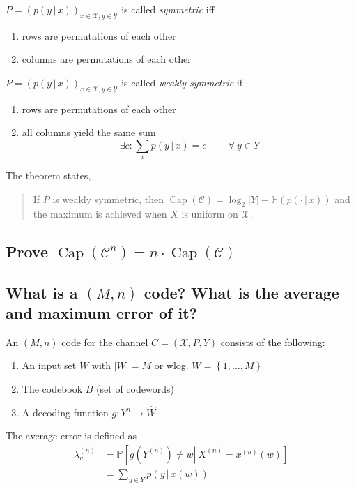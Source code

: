 \documentclass[a4paper]{article}
\newcommand\op[2][P]{\mathbb{#1}\left(#2\right)}
\newcommand\cons[3][P]{\mathbb{#1}\left[#2 \left|\:#3\right]\right.}
\newcommand\fall{\:\forall\:}
\newcommand\set[1]{\left\{#1\right\}}
\newcommand\key[1]{\textit{#1}}
\newcommand\card[1]{\left|#1\right|}
\DeclareMathOperator{\Capacity}{Cap}
\theoremstyle{definition}
\begin{document}
$P = (p(y\,|\,x))_{x \in \mathcal{X}, y \in \mathcal{Y}}$ is called \key{symmetric} iff
\begin{enumerate}
  \item rows are permutations of each other
  \item columns are permutations of each other
\end{enumerate}

$P = (p(y\,|\,x))_{x \in \mathcal{X}, y \in \mathcal{Y}}$ is called \key{weakly symmetric} if
\begin{enumerate}
  \item rows are permutations of each other
  \item all columns yield the same sum
    \[ \exists c: \sum_x p(y\,|\,x) = c \qquad \fall y \in Y \]
\end{enumerate}

The theorem states,
\begin{quote}
  If $P$ is weakly symmetric, then $\Capacity(\mathcal{C}) = \log_2\card{Y} - \op[H]{p(\cdot\,|\,x)}$ and the maximum is achieved when $X$ is uniform on $\mathcal{X}$.
\end{quote}

\subsection{Prove $\Capacity(\mathcal{C}^n) = n \cdot \Capacity(\mathcal{C})$}

\subsection{What is a $(M, n)$ code? What is the average and maximum error of it?}

An $(M, n)$ code for the channel $C = (\mathcal{X}, P, Y)$ consists of the following:
\begin{enumerate}
  \item An input set $W$ with $\card{W} = M$ or wlog. $W = \set{1,\dotsc,M}$
  \item The codebook $B$ (set of codewords)
  \item A decoding function $g: Y^n \rightarrow \hat W$
\end{enumerate}

The average error is defined as
\begin{align*}
  \lambda_w^{(n)} &= \cons{g(Y^{(n)}) \neq w}{X^{(n)} = x^{(n)}(w)} \\
                  &= \sum_{y \in Y} p(y \,|\, x(w))
\end{align*}
\end{document}
